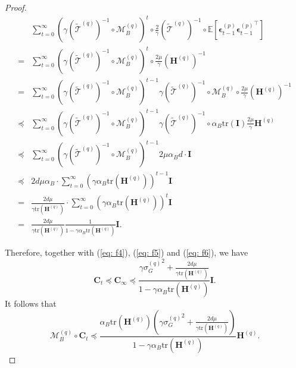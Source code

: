 \documentclass[11pt, letterpaper]{article}
\begin{document}
\begin{proof}
\begin{equation}
\begin{aligned}
        &\sum_{t=0}^\infty\left(\gamma(\widetilde{\mathcal{T}}^{(q)})^{-1}\circ\mathcal{M}_B^{(q)}\right)^t\circ\frac{2}{\gamma}(\widetilde{\mathcal{T}}^{(q)})^{-1}\circ\mathbb{E}\left[\boldsymbol{\epsilon}_{t-1}^{(p)}{\boldsymbol{\epsilon}_{t-1}^{(p)}}^\top\right]\\
        =&\sum_{t=0}^\infty\left(\gamma(\widetilde{\mathcal{T}}^{(q)})^{-1}\circ\mathcal{M}_B^{(q)}\right)^t\circ\frac{2\mu}{\gamma}(\mathbf{H}^{(q)})^{-1}\\
        =&\sum_{t=0}^\infty\left(\gamma(\widetilde{\mathcal{T}}^{(q)})^{-1}\circ\mathcal{M}_B^{(q)}\right)^{t-1}\gamma(\widetilde{\mathcal{T}}^{(q)})^{-1}\circ\mathcal{M}_B^{(q)}\circ\frac{2\mu}{\gamma}(\mathbf{H}^{(q)})^{-1}\\
        \preceq&\sum_{t=0}^\infty\left(\gamma(\widetilde{\mathcal{T}}^{(q)})^{-1}\circ\mathcal{M}_B^{(q)}\right)^{t-1}\gamma(\widetilde{\mathcal{T}}^{(q)})^{-1}\circ\alpha_B\mathrm{tr}(\mathbf{I})\frac{2\mu}{\gamma}\mathbf{H}^{(q)}\\
        \preceq&\sum_{t=0}^\infty\left(\gamma(\widetilde{\mathcal{T}}^{(q)})^{-1}\circ\mathcal{M}_B^{(q)}\right)^{t-1}2\mu\alpha_Bd\cdot\mathbf{I}\\
        \preceq&2d\mu \alpha_B \cdot \sum_{t=0}^\infty \left(\gamma \alpha_B\mathrm{tr}(\mathbf{H}^{(q)})\right)^{t-1}\mathbf{I}\\
        =&\frac{2d\mu}{\gamma\mathrm{tr}(\mathbf{H}^{(q)})} \cdot \sum_{t=0}^\infty \left(\gamma \alpha_B\mathrm{tr}(\mathbf{H}^{(q)})\right)^{t}\mathbf{I}\\
        =&\frac{2d\mu}{\gamma\mathrm{tr}(\mathbf{H}^{(q)})} \frac{1}{1-\gamma\alpha_B\mathrm{tr}\left(\mathbf{H}^{(q)}\right)}\mathbf{I}.
    \end{aligned}
\end{equation}

Therefore, together with (\ref{eq: f4}), (\ref{eq: f5}) and (\ref{eq: f6}), we have
\begin{equation*}
    \mathbf{C}_t\preceq\mathbf{C}_\infty\preceq \frac{\gamma{\sigma_G^{(q)}}^2+\frac{2d\mu}{\gamma\mathrm{tr}(\mathbf{H}^{(q)})}}{1-\gamma\alpha_B\mathrm{tr}(\mathbf{H}^{(q)})}\mathbf{I}.
\end{equation*}
It follows that
\begin{equation*}
    \mathcal{M}_B^{(q)} \circ \mathbf{C}_t \preceq \frac{\alpha_B\mathrm{tr}(\mathbf{H}^{(q)})\left(\gamma{\sigma_G^{(q)}}^2+\frac{2d\mu}{\gamma\mathrm{tr}(\mathbf{H}^{(q)})}\right)}{1-\gamma\alpha_B\mathrm{tr}(\mathbf{H}^{(q)})} \mathbf{H}^{(q)}.
\end{equation*}
\end{proof}
\end{document}
